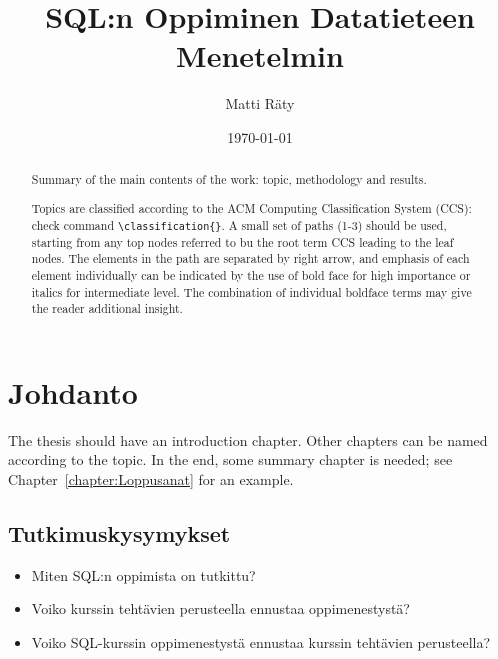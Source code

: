 \documentclass[finnish,twoside,openright]{HYgraduMLDS}
\title{SQL:n Oppiminen Datatieteen Menetelmin}
\author{Matti Räty}
\date{\today}
\begin{document}
\maketitle


\begin{abstract}
Summary of the main contents of the work: topic, methodology and results.

Topics are classified according to the ACM Computing Classification System
(CCS): check command \verb+\classification{}+. A small set of paths (1-3) should be used, starting from any top nodes
referred to bu the root term CCS leading to the leaf nodes. The elements
in the path are separated by right arrow, and emphasis of each element individually can be indicated
by the use of bold face for high importance or italics for intermediate
level. The combination of individual boldface terms may give the reader
additional insight. 
\end{abstract}

\mytableofcontents

\mynomenclature

\chapter{Johdanto}

The thesis should have an introduction chapter. Other chapters can be named according to the topic. In the end, some summary chapter is needed; see Chapter~\ref{chapter:Loppusanat} for an example.

\section{Tutkimuskysymykset}

\begin{itemize}
    \item Miten SQL:n oppimista on tutkittu?
    \item Voiko kurssin tehtävien perusteella ennustaa oppimenestystä?
    \item Voiko SQL-kurssin oppimenestystä ennustaa kurssin tehtävien perusteella?
\end{itemize}
\end{document}
